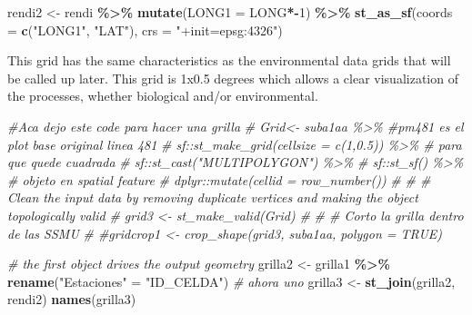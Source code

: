 \documentclass[
]{article}
\newenvironment{Shaded}{\begin{snugshade}}{\end{snugshade}}
\newcommand{\AttributeTok}[1]{\textcolor[rgb]{0.13,0.29,0.53}{#1}}
\newcommand{\CommentTok}[1]{\textcolor[rgb]{0.56,0.35,0.01}{\textit{#1}}}
\newcommand{\DecValTok}[1]{\textcolor[rgb]{0.00,0.00,0.81}{#1}}
\newcommand{\FunctionTok}[1]{\textcolor[rgb]{0.13,0.29,0.53}{\textbf{#1}}}
\newcommand{\NormalTok}[1]{#1}
\newcommand{\OtherTok}[1]{\textcolor[rgb]{0.56,0.35,0.01}{#1}}
\newcommand{\SpecialCharTok}[1]{\textcolor[rgb]{0.81,0.36,0.00}{\textbf{#1}}}
\newcommand{\StringTok}[1]{\textcolor[rgb]{0.31,0.60,0.02}{#1}}
\begin{document}
\begin{Shaded}
\begin{Highlighting}[]
\NormalTok{rendi2 }\OtherTok{\textless{}{-}}\NormalTok{ rendi }\SpecialCharTok{\%\textgreater{}\%} 
  \FunctionTok{mutate}\NormalTok{(}\AttributeTok{LONG1 =}\NormalTok{ LONG}\SpecialCharTok{*{-}}\DecValTok{1}\NormalTok{) }\SpecialCharTok{\%\textgreater{}\%} 
  \FunctionTok{st\_as\_sf}\NormalTok{(}\AttributeTok{coords =} \FunctionTok{c}\NormalTok{(}\StringTok{"LONG1"}\NormalTok{, }\StringTok{"LAT"}\NormalTok{),  }
                  \AttributeTok{crs =} \StringTok{"+init=epsg:4326"}\NormalTok{) }
\end{Highlighting}
\end{Shaded}

This grid has the same characteristics as the environmental data grids
that will be called up later. This grid is 1x0.5 degrees which allows a
clear visualization of the processes, whether biological and/or
environmental.

\begin{Shaded}
\begin{Highlighting}[]
\CommentTok{\#Aca dejo este code para hacer una grilla}
\CommentTok{\# Grid\textless{}{-} suba1aa  \%\textgreater{}\% \#pm481 es el plot base original linea 481}
\CommentTok{\#   sf::st\_make\_grid(cellsize = c(1,0.5)) \%\textgreater{}\% \# para que quede cuadrada}
\CommentTok{\#   sf::st\_cast("MULTIPOLYGON") \%\textgreater{}\%}
\CommentTok{\#   sf::st\_sf()  \%\textgreater{}\%  \# objeto en spatial feature}
\CommentTok{\#   dplyr::mutate(cellid = row\_number()) }
\CommentTok{\# }
\CommentTok{\# \# Clean the input data by removing duplicate vertices and making the object topologically valid}
\CommentTok{\# grid3 \textless{}{-} st\_make\_valid(Grid)}
\CommentTok{\# }
\CommentTok{\# \# Corto la grilla dentro de las SSMU}
\CommentTok{\# \#gridcrop1 \textless{}{-} crop\_shape(grid3, suba1aa, polygon = TRUE)}

\CommentTok{\# the first object drives the output geometry}
\NormalTok{grilla2 }\OtherTok{\textless{}{-}}\NormalTok{ grilla1 }\SpecialCharTok{\%\textgreater{}\%}
  \FunctionTok{rename}\NormalTok{(}\StringTok{"Estaciones"} \OtherTok{=} \StringTok{"ID\_CELDA"}\NormalTok{) }
\CommentTok{\# ahora uno}
\NormalTok{grilla3 }\OtherTok{\textless{}{-}} \FunctionTok{st\_join}\NormalTok{(grilla2, rendi2)}
\FunctionTok{names}\NormalTok{(grilla3)}
\end{Highlighting}
\end{Shaded}
\end{document}
